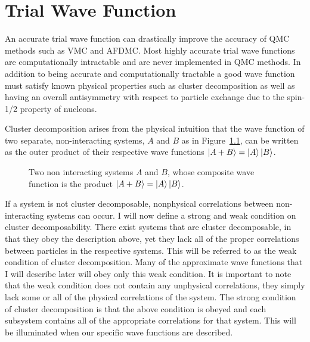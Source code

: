 \chapter{Trial Wave Function}
An accurate trial wave function can drastically improve the accuracy of QMC methods such as VMC and AFDMC. Most highly accurate trial wave functions are computationally intractable and are never implemented in QMC methods. In addition to being accurate and computationally tractable a good wave function must satisfy known physical properties such as cluster decomposition as well as having an overall antisymmetry with respect to particle exchange due to the spin-1/2 property of nucleons.

Cluster decomposition arises from the physical intuition that the wave function of two separate, non-interacting systems, $A$ and $B$ as in Figure~\ref{fig:cluster}, can be written as the outer product of their respective wave functions $\left| A+B \right>=\left| A \right>\left| B \right>$.
\begin{figure}[h]
   \centering
   \caption{Two non interacting systems $A$ and $B$, whose composite wave function is the product $\left| A+B \right>=\left| A \right>\left| B \right>$.}
   \label{fig:cluster}
\end{figure}
If a system is not cluster decomposable, nonphysical correlations between non-interacting systems can occur. I will now define a strong and weak condition on cluster decomposability. There exist systems that are cluster decomposable, in that they obey the description above, yet they lack all of the proper correlations between particles in the respective systems. This will be referred to as the weak condition of cluster decomposition. Many of the approximate wave functions that I will describe later will obey only this weak condition. It is important to note that the weak condition does not contain any unphysical correlations, they simply lack some or all of the physical correlations of the system. The strong condition of cluster decomposition is that the above condition is obeyed and each subsystem contains all of the appropriate correlations for that system. This will be illuminated when our specific wave functions are described.

